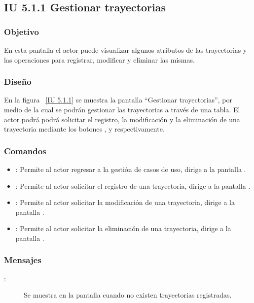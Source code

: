 \subsection{IU 5.1.1 Gestionar trayectorias}
\subsubsection{Objetivo}
	
	En esta pantalla el actor puede visualizar algunos atributos de las trayectorias y las operaciones para registrar, modificar y eliminar las mismas.

\subsubsection{Diseño}

    En la figura ~\ref{IU 5.1.1} se muestra la pantalla ``Gestionar trayectorias'', por medio de la cual 
    se podrán gestionar las trayectorias a través de una tabla.
    El actor podrá podrá solicitar el registro, la modificación y la eliminación de una trayectoria mediante los botones
    , \btnEditar y \btnEliminar respectivamente. \\
    



\subsubsection{Comandos}
\begin{itemize}
	\item {}: Permite al actor regresar a la gestión de casos de uso, dirige a la pantalla .
	\item {}: Permite al actor solicitar el registro de una trayectoria, dirige a la pantalla .
	\item \btnEditar[Modificar]: Permite al actor solicitar la modificación de una trayectoria, dirige a la pantalla .
	\item \btnEliminar[Eliminar]: Permite al actor solicitar la eliminación de una trayectoria, dirige a la pantalla .
\end{itemize}

\subsubsection{Mensajes}

	
\begin{description}
	\item[:] Se muestra en la pantalla  cuando no existen trayectorias registradas.
\end{description}
